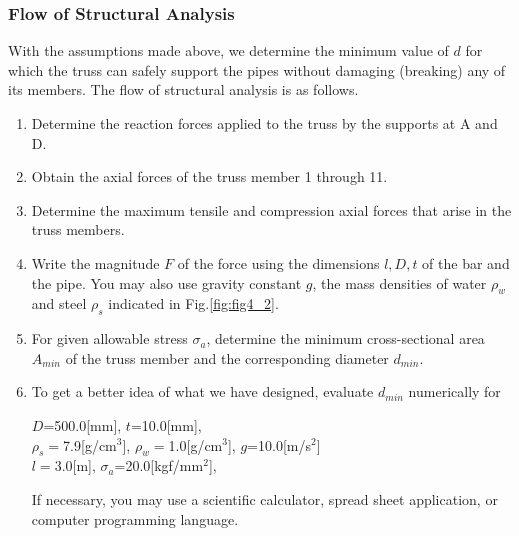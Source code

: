 \documentclass[10pt,a4j]{article}
\begin{document}
\subsubsection{Flow of Structural Analysis}
With the assumptions made above, we determine the minimum value of $d$ for which the 
truss can safely support the pipes without damaging (breaking) any of its members. 
The flow of structural analysis is as follows.
\begin{enumerate}
\item
	Determine the reaction forces applied to the truss by the supports at A and D. 
\item
	Obtain the axial forces of the truss member 1 through 11. 
\item
	Determine the maximum tensile and compression axial forces that arise in the truss members. 
\item
	Write the magnitude $F$ of the force using the dimensions $l,D,t$ of the bar and the pipe. 
	You may also use gravity constant $g$, the mass densities of water $\rho_w$ and steel $\rho_s$ 
	indicated in Fig.\ref{fig:fig4_2}. 
\item
	For given allowable stress $\sigma_a$, determine the minimum cross-sectional 
	area $A_{min}$ of the truss member and the corresponding diameter $d_{min}$. 
\item
	To get a better idea of what we have designed, evaluate $d_{min}$ numerically for\\
		\begin{center}
			$D$=500.0[mm], $t$=10.0[mm],  \\
			$\rho_s=$7.9[g/cm$^3$],
			$\rho_w=$1.0[g/cm$^3$],
			$g$=10.0[m/s$^2$] \\
			$l=3.0$[m],
			$\sigma_a$=20.0[kgf/mm$^2$], 
		\end{center}
	If necessary, you may use a scientific calculator, spread sheet application, or computer programming language. 
\end{enumerate}
\end{document}

